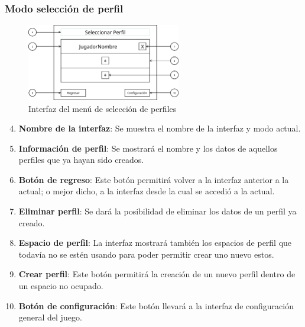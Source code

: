 \subsubsection{Modo selección de perfil}
\begin{figure}[H]
    \centering
    \includegraphics[width=0.6\textwidth]{5-Cuerpo/Chapter5/I2.png} %
    \caption{Interfaz del menú de selección de perfiles}
    \label{fig:Interface_Seleccion_Perfil}
\end{figure}
\begin{enumerate}\setcounter{enumi}{3}
    \item \textbf{Nombre de la interfaz}: Se muestra el nombre de la interfaz y
    modo actual.
    \item \textbf{Información de perfil}: Se mostrará el nombre y los datos de
    aquellos perfiles que ya hayan sido creados.
    \item \textbf{Botón de regreso}: Este botón permitirá volver a la interfaz
    anterior a la actual; o mejor dicho, a la interfaz desde la cual se accedió
    a la actual.
    \item \textbf{Eliminar perfil}: Se dará la posibilidad de eliminar los datos
    de un perfil ya creado.
    \item \textbf{Espacio de perfil}: La interfaz mostrará también los espacios
    de perfil que todavía no se estén usando para poder permitir crear uno nuevo
    estos.
    \item \textbf{Crear perfil}: Este botón permitirá la creación de un nuevo
    perfil dentro de un espacio no ocupado.
    \item \textbf{Botón de configuración}: Este botón llevará a la interfaz de
    configuración general del juego.
\end{enumerate}

